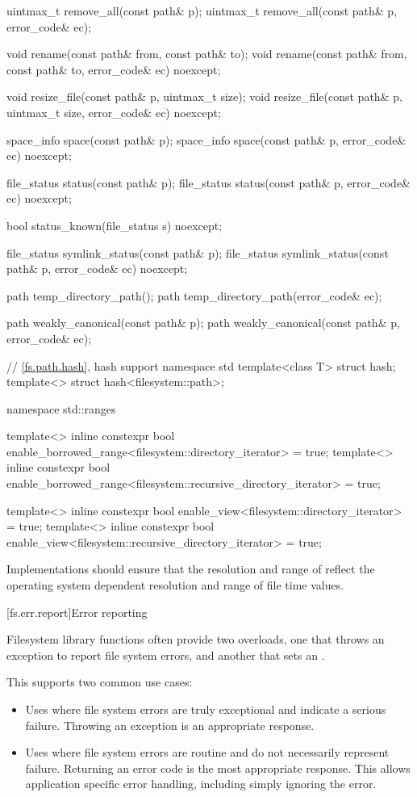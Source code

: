 \begin{codeblock}
{  uintmax_t remove_all(const path& p);
  uintmax_t remove_all(const path& p, error_code& ec);

  void rename(const path& from, const path& to);
  void rename(const path& from, const path& to, error_code& ec) noexcept;

  void resize_file(const path& p, uintmax_t size);
  void resize_file(const path& p, uintmax_t size, error_code& ec) noexcept;

  space_info space(const path& p);
  space_info space(const path& p, error_code& ec) noexcept;

  file_status status(const path& p);
  file_status status(const path& p, error_code& ec) noexcept;

  bool status_known(file_status s) noexcept;

  file_status symlink_status(const path& p);
  file_status symlink_status(const path& p, error_code& ec) noexcept;

  path temp_directory_path();
  path temp_directory_path(error_code& ec);

  path weakly_canonical(const path& p);
  path weakly_canonical(const path& p, error_code& ec);
}

// \ref{fs.path.hash}, hash support
namespace std {
  template<class T> struct hash;
  template<> struct hash<filesystem::path>;
}

namespace std::ranges {
  template<>
    inline constexpr bool enable_borrowed_range<filesystem::directory_iterator> = true;
  template<>
    inline constexpr bool enable_borrowed_range<filesystem::recursive_directory_iterator> = true;

  template<>
    inline constexpr bool enable_view<filesystem::directory_iterator> = true;
  template<>
    inline constexpr bool enable_view<filesystem::recursive_directory_iterator> = true;
}
\end{codeblock}

\pnum
Implementations should ensure that the resolution and range of
 reflect the operating system dependent resolution and range
of file time values.

[fs.err.report]{Error reporting}

\pnum
Filesystem library functions often provide two overloads, one that
throws an exception to report file system errors, and another that sets an .
\begin{note}
This supports two common use cases:
\begin{itemize}
\item
Uses where file system errors are truly exceptional
and indicate a serious failure.
Throwing an exception is an appropriate response.
\item
Uses where file system errors are routine
and do not necessarily represent failure.
Returning an error code is the most appropriate response.
This allows application specific error handling, including simply ignoring the error.
\end{itemize}
\end{note}

